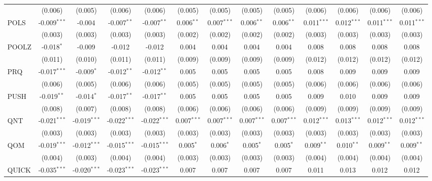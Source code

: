 \begin{table}[!htbp]
\begin{tabular}{@{\extracolsep{5pt}}lcccccccccccc}
  & (0.006) & (0.005) & (0.006) & (0.006) & (0.005) & (0.005) & (0.005) & (0.005) & (0.006) & (0.006) & (0.006) & (0.006) \\
 POLS & -0.009$^{***}$ & -0.004$^{}$ & -0.007$^{**}$ & -0.007$^{**}$ & 0.006$^{**}$ & 0.007$^{***}$ & 0.006$^{**}$ & 0.006$^{**}$ & 0.011$^{***}$ & 0.012$^{***}$ & 0.011$^{***}$ & 0.011$^{***}$ \\
  & (0.003) & (0.003) & (0.003) & (0.003) & (0.002) & (0.002) & (0.002) & (0.002) & (0.003) & (0.003) & (0.003) & (0.003) \\
 POOLZ & -0.018$^{*}$ & -0.009$^{}$ & -0.012$^{}$ & -0.012$^{}$ & 0.004$^{}$ & 0.004$^{}$ & 0.004$^{}$ & 0.004$^{}$ & 0.008$^{}$ & 0.008$^{}$ & 0.008$^{}$ & 0.008$^{}$ \\
  & (0.011) & (0.010) & (0.011) & (0.011) & (0.009) & (0.009) & (0.009) & (0.009) & (0.012) & (0.012) & (0.012) & (0.012) \\
 PRQ & -0.017$^{***}$ & -0.009$^{*}$ & -0.012$^{**}$ & -0.012$^{**}$ & 0.005$^{}$ & 0.005$^{}$ & 0.005$^{}$ & 0.005$^{}$ & 0.008$^{}$ & 0.009$^{}$ & 0.009$^{}$ & 0.009$^{}$ \\
  & (0.006) & (0.005) & (0.006) & (0.006) & (0.005) & (0.005) & (0.005) & (0.005) & (0.006) & (0.006) & (0.006) & (0.006) \\
 PUSH & -0.019$^{**}$ & -0.014$^{*}$ & -0.017$^{**}$ & -0.017$^{**}$ & 0.005$^{}$ & 0.005$^{}$ & 0.005$^{}$ & 0.005$^{}$ & 0.009$^{}$ & 0.010$^{}$ & 0.009$^{}$ & 0.009$^{}$ \\
  & (0.008) & (0.007) & (0.008) & (0.008) & (0.006) & (0.006) & (0.006) & (0.006) & (0.009) & (0.009) & (0.009) & (0.009) \\
 QNT & -0.021$^{***}$ & -0.019$^{***}$ & -0.022$^{***}$ & -0.022$^{***}$ & 0.007$^{***}$ & 0.007$^{***}$ & 0.007$^{***}$ & 0.007$^{***}$ & 0.012$^{***}$ & 0.013$^{***}$ & 0.012$^{***}$ & 0.012$^{***}$ \\
  & (0.003) & (0.003) & (0.003) & (0.003) & (0.003) & (0.003) & (0.003) & (0.003) & (0.003) & (0.003) & (0.003) & (0.003) \\
 QOM & -0.019$^{***}$ & -0.012$^{***}$ & -0.015$^{***}$ & -0.015$^{***}$ & 0.005$^{*}$ & 0.006$^{*}$ & 0.005$^{*}$ & 0.005$^{*}$ & 0.009$^{**}$ & 0.010$^{**}$ & 0.009$^{**}$ & 0.009$^{**}$ \\
  & (0.004) & (0.003) & (0.004) & (0.004) & (0.003) & (0.003) & (0.003) & (0.003) & (0.004) & (0.004) & (0.004) & (0.004) \\
 QUICK & -0.035$^{***}$ & -0.020$^{***}$ & -0.023$^{***}$ & -0.023$^{***}$ & 0.007$^{}$ & 0.007$^{}$ & 0.007$^{}$ & 0.007$^{}$ & 0.011$^{}$ & 0.013$^{}$ & 0.012$^{}$ & 0.012$^{}$ \\

\end{tabular}
\end{table}
